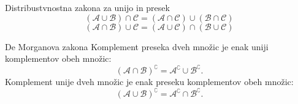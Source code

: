     \begin{frame}
        \begin{block}{Distribustvnostna zakona za unijo in presek}
            $$ \left(\mathcal{A}\cup\mathcal{B}\right)\cap\mathcal{C}=\left(\mathcal{A}\cap\mathcal{C}\right)\cup\left(\mathcal{B}\cap\mathcal{C}\right) $$
            $$ \left(\mathcal{A}\cap\mathcal{B}\right)\cup\mathcal{C}=\left(\mathcal{A}\cup\mathcal{C}\right)\cap\left(\mathcal{B}\cup\mathcal{C}\right) $$
        \end{block}

        \begin{block}{De Morganova zakona}
            Komplement preseka dveh množic je enak uniji komplementov obeh množic:
            $$\left(\mathcal{A}\cap\mathcal{B}\right)^\complement=\mathcal{A}^\complement\cup\mathcal{B}^\complement. $$
            Komplement unije dveh množic je enak preseku komplementov obeh množic:
            $$\left(\mathcal{A}\cup\mathcal{B}\right)^\complement=\mathcal{A}^\complement\cap\mathcal{B}^\complement. $$
        \end{block}
    \end{frame}

